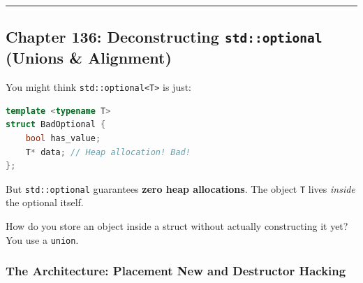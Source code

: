\begin{center}\rule{0.5\linewidth}{0.5pt}\end{center}

\hypertarget{chapter-136-deconstructing-stdoptional-unions-alignment}{%
\subsection{\texorpdfstring{Chapter 136: Deconstructing
\texttt{std::optional} (Unions \&
Alignment)}{Chapter 136: Deconstructing std::optional (Unions \& Alignment)}}\label{chapter-136-deconstructing-stdoptional-unions-alignment}}

You might think \passthrough{\lstinline!std::optional<T>!} is just:

\begin{lstlisting}[language={C++}]
template <typename T>
struct BadOptional {
    bool has_value;
    T* data; // Heap allocation! Bad!
};
\end{lstlisting}

But \passthrough{\lstinline!std::optional!} guarantees \textbf{zero heap
allocations}. The object \passthrough{\lstinline!T!} lives \emph{inside}
the optional itself.

How do you store an object inside a struct without actually constructing
it yet? You use a \passthrough{\lstinline!union!}.

\hypertarget{the-architecture-placement-new-and-destructor-hacking}{%
\subsubsection{The Architecture: Placement New and Destructor
Hacking}\label{the-architecture-placement-new-and-destructor-hacking}}

